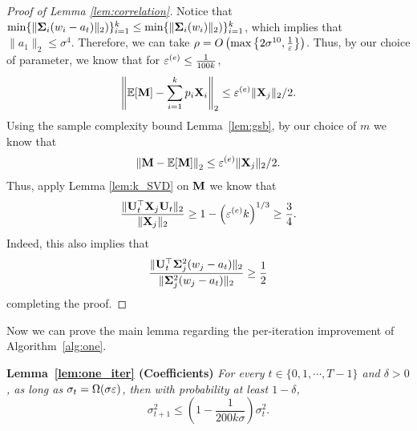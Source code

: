 \begin{proof}[Proof of Lemma \ref{lem:correlation}]
Notice that $ \min\{\| \bold{\Sigma}_i (w_i - a_t) \|_2) \}_{i = 1}^k \leq  \min\{\| \bold{\Sigma}_i (w_i ) \|_2) \}_{i = 1}^k$, which implies that $\| a_1 \|_2 \leq \sigma^4$. Therefore, we can take $\rho =O\left( \max\left\{2\sigma^{10}, \frac{1}{\varepsilon} \right\}\right)$. Thus, by our choice of parameter, we know that for $\varepsilon^{(e)} \leq \frac{1}{100 k} $, 
\begin{align}
\left\|\mathbb{E}[\bold{M}] - \sum_{i= 1}^k p_i \bold{X}_i \right\|_2 \leq \varepsilon^{(e)}\| \bold{X}_j \|_2/2.
\end{align}
Using the sample complexity bound Lemma~\ref{lem:gsb}, by our choice of $m$ we know that 
\begin{align}
\left\|\bold{M} - \mathbb{E}[\bold{M}] \right\|_2 \leq \varepsilon^{(e)}\| \bold{X}_j \|_2/2.
\end{align}
Thus, apply Lemma \ref{lem:k_SVD} on $\bold{M}$ we know that 
\begin{align}
\frac{\|\bold{U}_t^{\top} \bold{X}_j \bold{U}_t \|_2}{\|\bold{X}_j\|_2} \geq 1 - \left(\varepsilon^{(e)}k\right)^{1/3} \geq \frac{3}{4}.
\end{align}
Indeed, this also implies that 
\begin{align}
\frac{\|\bold{U}_t^{\top} \bold{\Sigma}_j^2 (w_j - a_t) \|_2}{\| \bold{\Sigma}_j^2 (w_j - a_t)  \|_2 } \geq \frac{1}{2}
\end{align}
completing the proof.
\end{proof}


Now we can prove the main lemma regarding the per-iteration improvement of Algorithm~\ref{alg:one}.



\medskip
\noindent
\textbf{Lemma~\ref{lem:one_iter} (Coefficients)}
{\it
For every $t \in \{0, 1, \cdots, T - 1\}$ and $\delta > 0$, as long as $\sigma_t = \Omega ( \sigma \varepsilon)$, then with probability at least $1 - \delta$,
$$
\sigma_{t + 1}^2 \leq \left(1 - \frac{1}{200 k \sigma} \right) \sigma_t^2.
$$
}
\medskip

